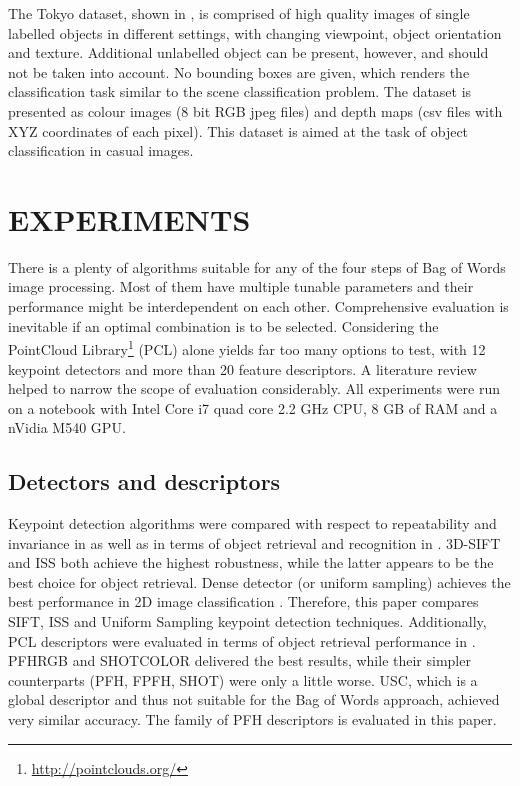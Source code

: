 \documentclass[11pt,twoside]{article}
\begin{document}
    The Tokyo dataset, shown in , is comprised of high quality images of single labelled objects in different settings, with changing viewpoint, object orientation and texture. Additional unlabelled object can be present, however, and should not be taken into account. No bounding boxes are given, which renders the classification task similar to the scene classification problem. The dataset is presented as colour images (8 bit RGB jpeg files) and depth maps (csv files with XYZ coordinates of each pixel). This dataset is aimed at the task of object classification in casual images.

\section{ EXPERIMENTS }
  There is a plenty of algorithms suitable for any of the four steps of Bag of Words image processing. Most of them have multiple tunable parameters and their performance might be interdependent on each other. Comprehensive evaluation is inevitable if an optimal combination is to be selected. Considering the PointCloud Library\footnote{\url{http://pointclouds.org/}} (PCL) alone yields far too many options to test, with 12 keypoint detectors and more than 20 feature descriptors. A literature review helped to narrow the scope of evaluation considerably. All experiments were run on a notebook with Intel Core i7 quad core 2.2 GHz CPU, 8 GB of RAM and a nVidia M540 GPU. 

  \subsection{Detectors and descriptors}
    Keypoint detection algorithms were compared with respect to repeatability and invariance in \cite{pcl_keypoint_comparision} as well as in terms of object retrieval and recognition in \cite{3d_keypoint_eval}. 3D-SIFT and ISS both achieve the highest robustness, while the latter appears to be the best choice for object retrieval. Dense detector (or uniform sampling) achieves the best performance in 2D image classification \cite{tsai2012bag}. Therefore, this paper compares SIFT, ISS and Uniform Sampling keypoint detection techniques. Additionally, PCL descriptors were evaluated in terms of object retrieval performance in \cite{pcl_features}. PFHRGB and SHOTCOLOR delivered the best results, while their simpler counterparts (PFH, FPFH, SHOT) were only a little worse. USC, which is a global descriptor and thus not suitable for the Bag of Words approach, achieved very similar accuracy. The family of PFH descriptors is evaluated in this paper.
    
\end{document}

